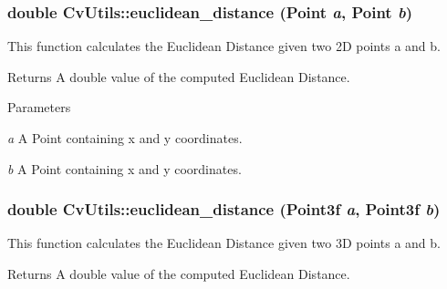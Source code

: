\hypertarget{classCvUtils_a74b4a32b47136f704db2729b39095c02}{
\subsubsection[{euclidean\_\-distance}]{\setlength{\rightskip}{0pt plus 5cm}double CvUtils::euclidean\_\-distance (Point {\em a}, \/  Point {\em b})}}
\label{classCvUtils_a74b4a32b47136f704db2729b39095c02}
This function calculates the Euclidean Distance given two 2D points a and b. \begin{DoxyReturn}{Returns}
A double value of the computed Euclidean Distance. 
\end{DoxyReturn}

\begin{DoxyParams}{Parameters}
\item[{\em a}]A Point containing x and y coordinates. \item[{\em b}]A Point containing x and y coordinates. \end{DoxyParams}
\hypertarget{classCvUtils_a20d53b92663d548bebf90da242d984f3}{
\subsubsection[{euclidean\_\-distance}]{\setlength{\rightskip}{0pt plus 5cm}double CvUtils::euclidean\_\-distance (Point3f {\em a}, \/  Point3f {\em b})}}
\label{classCvUtils_a20d53b92663d548bebf90da242d984f3}
This function calculates the Euclidean Distance given two 3D points a and b. \begin{DoxyReturn}{Returns}
A double value of the computed Euclidean Distance. 
\end{DoxyReturn}

